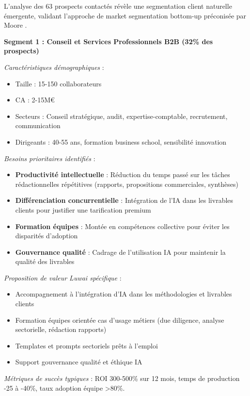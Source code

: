 L'analyse des 63 prospects contactés révèle une segmentation client naturelle émergente, validant l'approche de market segmentation bottom-up préconisée par Moore \cite{moore2014crossing}.

\textbf{Segment 1 : Conseil et Services Professionnels B2B (32\% des prospects)}

\emph{Caractéristiques démographiques} :
\begin{itemize}
    \item Taille : 15-150 collaborateurs
    \item CA : 2-15M€
    \item Secteurs : Conseil stratégique, audit, expertise-comptable, recrutement, communication
    \item Dirigeants : 40-55 ans, formation business school, sensibilité innovation
\end{itemize}

\emph{Besoins prioritaires identifiés} \cite{luwai2025segmentation} :
\begin{itemize}
    \item \textbf{Productivité intellectuelle} : Réduction du temps passé sur les tâches rédactionnelles répétitives (rapports, propositions commerciales, synthèses)
    \item \textbf{Différenciation concurrentielle} : Intégration de l'IA dans les livrables clients pour justifier une tarification premium
    \item \textbf{Formation équipes} : Montée en compétences collective pour éviter les disparités d'adoption
    \item \textbf{Gouvernance qualité} : Cadrage de l'utilisation IA pour maintenir la qualité des livrables
\end{itemize}

\emph{Proposition de valeur Luwai spécifique} :
\begin{itemize}
    \item Accompagnement à l'intégration d'IA dans les méthodologies et livrables clients
    \item Formation équipes orientée cas d'usage métiers (due diligence, analyse sectorielle, rédaction rapports)
    \item Templates et prompts sectoriels prêts à l'emploi
    \item Support gouvernance qualité et éthique IA
\end{itemize}

\emph{Métriques de succès typiques} : ROI 300-500\% sur 12 mois, temps de production -25 à -40\%, taux adoption équipe >80\%.

